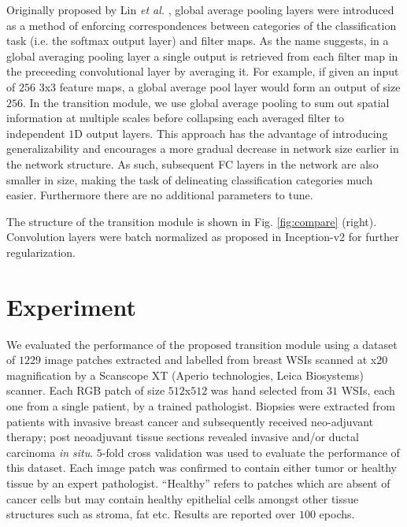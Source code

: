 \documentclass[runningheads,a4paper]{llncs}
\def\etal{\emph{et al. }}
\begin{document}
Originally proposed by Lin \etal \cite{Lin2014}, global average pooling layers were introduced as a method of enforcing correspondences between categories of the classification task (i.e. the softmax output layer) and filter maps. As the name suggests, in a global averaging pooling layer a single output is retrieved from each filter map in the preceeding convolutional layer by averaging it. For example, if given an input of $256$ $3$x$3$ feature maps, a global average pool layer would form an output of size $256$. 
In the transition module, we use global average pooling to sum out spatial information at multiple scales before collapsing each averaged filter to independent $1$D output layers. This approach has the advantage of introducing generalizability and encourages a more gradual decrease in network size earlier in the network structure. As such, subsequent FC layers in the network are also smaller in size, making the task of delineating classification categories much easier. Furthermore there are no additional parameters to tune. 

The structure of the transition module is shown in Fig. \ref{fig:compare} (right). Convolution layers were batch normalized as proposed in Inception-v2 for further regularization.

\section{Experiment}


We evaluated the performance of the proposed transition module using a dataset of $1229$ image patches extracted and labelled from breast WSIs scanned at x$20$ magnification by a Scanscope XT (Aperio technologies, Leica Biosystems) scanner. Each RGB patch of size $512$x$512$ was hand selected from $31$ WSIs, each one from a single patient, by a trained pathologist. Biopsies were extracted from patients with invasive breast cancer and subsequently received neo-adjuvant therapy; post neoadjuvant tissue sections revealed invasive and/or ductal carcinoma \emph{in situ}. 
$5$-fold cross validation was used to evaluate the performance of this dataset. Each image patch was confirmed to contain either tumor or healthy tissue by an expert pathologist. ``Healthy'' refers to patches which are absent of cancer cells but may contain healthy epithelial cells amongst other tissue structures such as stroma, fat etc. Results are reported over $100$ epochs. 
\end{document}
